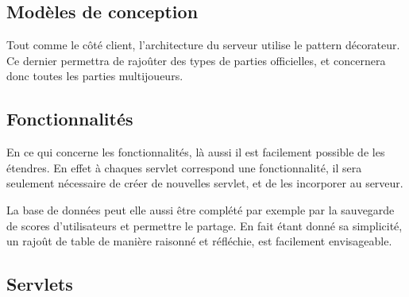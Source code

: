	\subsection{Modèles de conception}
	Tout comme le côté client, l'architecture du serveur utilise le pattern
	décorateur. Ce dernier permettra de rajoûter des types de parties officielles,
	et concernera donc toutes les parties multijoueurs.
	
	\subsection{Fonctionnalités}
	En ce qui concerne les fonctionnalités, là aussi il est facilement possible de
	les étendres. En effet à chaques servlet correspond une fonctionnalité, il 
	sera seulement nécessaire de créer de nouvelles servlet, et de les incorporer
	au serveur.
	
	La base de données peut elle aussi être complété par exemple par la sauvegarde
	de scores d'utilisateurs et permettre le partage. En fait étant donné sa
	simplicité, un rajoût de table de manière raisonné et réfléchie, est facilement
	envisageable.	
	

	\subsection{Servlets}